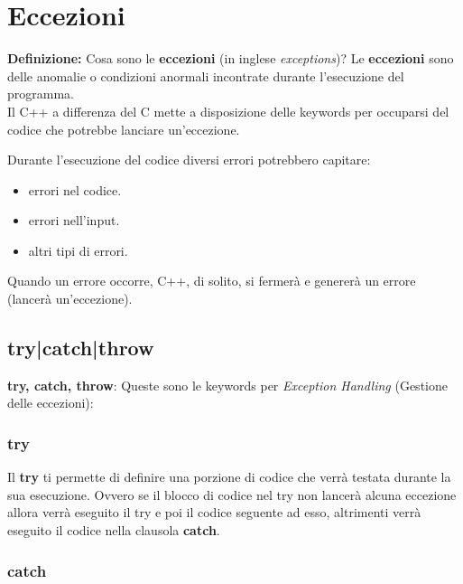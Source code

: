 \newpage

\section{Eccezioni}

\textsf{\small \textbf{Definizione: } Cosa sono le \textbf{eccezioni} (in inglese \emph{exceptions})? Le \textbf{eccezioni} sono delle anomalie o condizioni anormali incontrate durante l'esecuzione del programma.} \\

\textsf{\small Il C++ a differenza del C mette a disposizione delle keywords per occuparsi del codice che potrebbe lanciare un'eccezione.} \break

\textsf{\small Durante l'esecuzione del codice diversi errori potrebbero capitare: } \\

\begin{itemize}
	\item \textsf{\small errori nel codice.}
	\item \textsf{\small errori nell'input.}
	\item \textsf{\small altri tipi di errori.}
\end{itemize}

\textsf{\small Quando un errore occorre, C++, di solito, si fermerà e genererà un errore (lancerà un'eccezione).} \\

\subsection{try|catch|throw}

\textsf{\small \textbf{try, catch, throw}: Queste sono le keywords per \emph{Exception Handling} (Gestione delle eccezioni):}

\subsubsection{try}

\textsf{\small Il \textbf{try} ti permette di definire una porzione di codice che verrà testata durante la sua esecuzione. Ovvero se il blocco di codice nel try non lancerà alcuna eccezione allora verrà eseguito il try e poi il codice seguente ad esso, altrimenti verrà eseguito il codice nella clausola \textbf{catch}.} \\

\subsubsection{catch}

